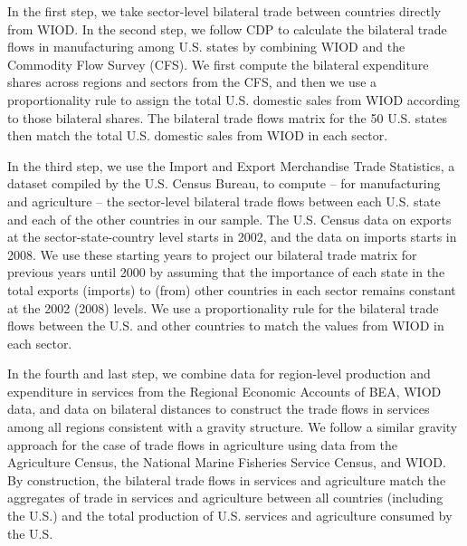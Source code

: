 \documentclass[12pt]{article}
\begin{document}
In the first step, we take sector-level bilateral trade between countries directly from WIOD. In the second step, we follow CDP to calculate the bilateral trade flows in manufacturing among U.S. states by combining WIOD and the Commodity Flow Survey (CFS). We first compute the bilateral expenditure shares across regions and sectors from the CFS, and then we use a proportionality rule to assign the total U.S. domestic sales from WIOD according to those bilateral shares. The bilateral trade flows matrix for the 50 U.S. states then match the total U.S. domestic sales from WIOD in each sector.

In the third step, we use the Import and Export Merchandise Trade Statistics, a dataset compiled by the U.S. Census Bureau, to compute -- for manufacturing and agriculture -- the sector-level bilateral trade flows between each U.S. state and each of the other countries in our sample. The U.S. Census data on exports at the sector-state-country level starts in 2002, and the data on imports starts in 2008. We use these starting years to project our bilateral trade matrix for previous years until 2000 by assuming that the importance of each state in the total exports (imports) to (from) other countries in each sector remains constant at the 2002 (2008) levels. We use a proportionality rule for the bilateral trade flows between the U.S. and other countries to match the values from WIOD in each sector.

In the fourth and last step, we combine data for region-level production and expenditure in services from the Regional Economic Accounts of BEA, WIOD data, and data on bilateral distances to construct the trade flows in services among all regions consistent with a gravity structure. We follow a similar gravity approach for the case of trade flows in agriculture using data from the Agriculture Census, the National Marine Fisheries Service Census, and WIOD. By construction, the bilateral trade flows in services and agriculture match the aggregates of trade in services and agriculture between all countries (including the U.S.) and the total production of U.S. services and agriculture consumed by the U.S. 
\end{document}
